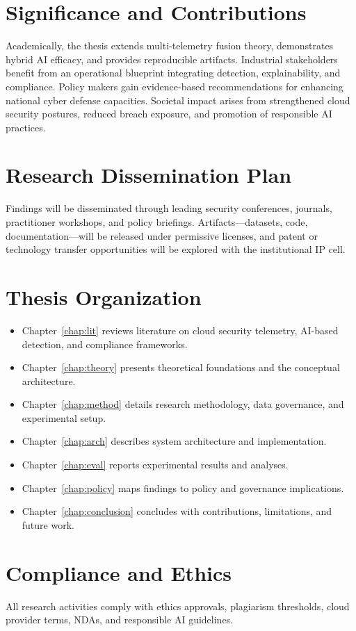 \section{Significance and Contributions}
Academically, the thesis extends multi-telemetry fusion theory, demonstrates hybrid AI efficacy, and provides reproducible artifacts. Industrial stakeholders benefit from an operational blueprint integrating detection, explainability, and compliance. Policy makers gain evidence-based recommendations for enhancing national cyber defense capacities. Societal impact arises from strengthened cloud security postures, reduced breach exposure, and promotion of responsible AI practices.

\section{Research Dissemination Plan}
Findings will be disseminated through leading security conferences, journals, practitioner workshops, and policy briefings. Artifacts---datasets, code, documentation---will be released under permissive licenses, and patent or technology transfer opportunities will be explored with the institutional IP cell.

\section{Thesis Organization}
\begin{itemize}
    \item Chapter~\ref{chap:lit} reviews literature on cloud security telemetry, AI-based detection, and compliance frameworks.
    \item Chapter~\ref{chap:theory} presents theoretical foundations and the conceptual architecture.
    \item Chapter~\ref{chap:method} details research methodology, data governance, and experimental setup.
    \item Chapter~\ref{chap:arch} describes system architecture and implementation.
    \item Chapter~\ref{chap:eval} reports experimental results and analyses.
    \item Chapter~\ref{chap:policy} maps findings to policy and governance implications.
    \item Chapter~\ref{chap:conclusion} concludes with contributions, limitations, and future work.
\end{itemize}

\section{Compliance and Ethics}
All research activities comply with ethics approvals, plagiarism thresholds, cloud provider terms, NDAs, and responsible AI guidelines.
